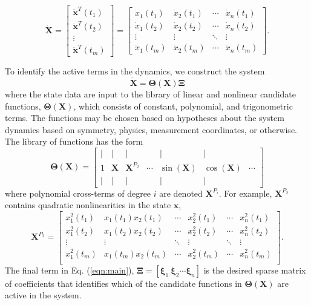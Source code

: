\documentclass[%
 aip,12pt,
rsi,%
 amsmath,amssymb,
 reprint,%
]{revtex4-1}
\newcommand{\refe}[1]{Eq. (\ref{#1})}
\begin{document}
{\begin{equation*}
  \bm{\dot{X}} = \begin{bmatrix} 
        \bm{\dot{x}}^T(t_1) \\ \bm{\dot{x}}^T(t_2) \\ \vdots \\ \bm{\dot{x}}^T(t_m)
      \end{bmatrix}
       = \begin{bmatrix}
          \dot{x}_1(t_1) & \dot{x}_2(t_1) & \cdots & \dot{x}_n(t_1) \\
          \dot{x}_1(t_2) & \dot{x}_2(t_2) & \cdots & \dot{x}_n(t_2) \\
          \vdots         & \vdots       & \ddots & \vdots  \\
          \dot{x}_1(t_m) & \dot{x}_2(t_m) & \cdots & \dot{x}_n(t_m)
        \end{bmatrix}.
\end{equation*}

To identify the active terms in the dynamics, we construct the system 
\begin{equation} \label{eqn:main}
  \bm{\dot{X}} = \bm{\Theta}(\bm{X})\bm{\Xi}
\end{equation}
where the state data are input to the library of linear and nonlinear candidate functions, $\bm{\Theta}(\bm{X})$, which consists of constant, polynomial, and trigonometric terms. The functions may be chosen based on hypotheses about the system dynamics based on symmetry, physics, measurement coordinates, or otherwise. The library of functions has the form
\begin{equation}
  \bm{\Theta}(\bm{X}) = 
  \begin{bmatrix}
    \mid & \mid   & \mid      &        & \mid       & \mid       &      \\
    1  & \bm{X}   & \bm{X}^{P_2}  & \cdots & \sin(\bm{X}) & \cos(\bm{X}) & \cdots \\
    \mid & \mid   & \mid      &        & \mid       & \mid       &
  \end{bmatrix}
\end{equation}
where polynomial cross-terms of degree $i$ are denoted $\bm{X}^{P_i}$. For example, $\bm{X}^{P_2}$ contains quadratic nonlinearities in the state $\bm{x}$,
\begin{equation*}
  \bm{X}^{P_2} = 
    \begin{bmatrix}
      x_1^2(t_1)  & x_1(t_1)x_2(t_1) & \cdots & x_2^2(t_1) & \cdots & x_n^2(t_1) \\
      x_1^2(t_2)  & x_1(t_2)x_2(t_2) & \cdots & x_2^2(t_2) & \cdots & x_n^2(t_2) \\
      \vdots    & \vdots         & \ddots & \vdots     & \ddots & \vdots   \\
      x_1^2(t_m)  & x_1(t_m)x_2(t_m) & \cdots & x_2^2(t_m) & \cdots & x_n^2(t_m) \\
    \end{bmatrix}.
\end{equation*}
The final term in \refe{eqn:main}, $\bm{\Xi} = [\bm{\xi}_1 \ \bm{\xi}_2 \cdots \bm{\xi}_n]$ is the desired sparse matrix of coefficients that identifies which of the candidate functions in $\bm{\Theta}(\bm{X})$ are active in the system. 

}
\end{document}
